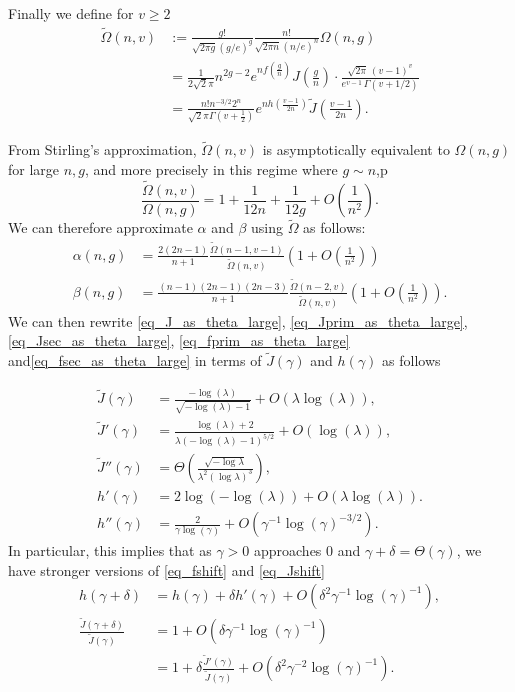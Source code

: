 \documentclass[a4paper,12pt]{article}
\theoremstyle{definition}
\newcommand{\bigO}[1]{O\left({#1}\right)}
\newcommand{\bigTheta}[1]{\Theta\left({#1}\right)}
\begin{document}
Finally we define for $v\geq 2$
\begin{align*}\tilde{\Omega}(n,v)&:=\frac{g!}{\sqrt{2\pi g}(g/e)^{g}}\frac{n!}{\sqrt{2\pi n}(n/e)^{n}}\Omega(n,g)\\
&=\frac{1}{2\sqrt{2}\pi}n^{2g-2}e^{nf(\frac{g}{n})}{J}\left(\frac{g}{n}\right)\cdot\frac{\sqrt{2\pi} \, (v-1)^{v}}{e^{v-1} \, \Gamma(v+1/2)}\\
&=\frac{n!n^{-3/2}2^{n}}{\sqrt{2}\pi\Gamma(v+\frac{1}{2})}e^{nh(\frac{v-1}{2n})}\tilde{J}\left(\frac{v-1}{2n}\right).\end{align*}

From Stirling's approximation, $\tilde{\Omega}(n,v)$ is asymptotically equivalent to $\Omega(n,g)$ for large $n,g$, and more precisely in this regime where $g\sim n$,p
\[\frac{\tilde{\Omega}(n,v)}{\Omega(n,g)}=1+\frac{1}{12n}+\frac{1}{12g}+\bigO{\frac{1}{n^{2}}}.\]
We can therefore approximate $\alpha$ and $\beta$ using $\tilde{\Omega}$ as follows: 
\begin{align}\label{eq:alphainomegatilde}\alpha(n,g)&=\frac{2(2n-1)}{n+1}\frac{\tilde{\Omega}(n-1,v-1)}{\tilde{\Omega}(n,v)}\left(1+O\left(\frac{1}{n^{2}}\right)\right)\\
\label{eq:betainomegatilde}\beta(n,g)&=\frac{(n-1)(2n-1)(2n-3)}{n+1}\frac{\tilde{\Omega}(n-2,v)}{\tilde{\Omega}(n,v)}\left(1+O\left(\frac{1}{n^{2}}\right)\right).\end{align}
We can then rewrite \eqref{eq_J_as_theta_large}, \eqref{eq_Jprim_as_theta_large}, \eqref{eq_Jsec_as_theta_large}, \eqref{eq_fprim_as_theta_large} and\eqref{eq_fsec_as_theta_large}  in terms of $\tilde{J}(\gamma)$ and $h(\gamma)$ as follows

\begin{align}
\tilde{J}(\gamma)
    &= \frac{-\log(\lambda)}{\sqrt{-\log(\lambda)-1}}+\bigO{\lambda\log(\lambda)},
\label{eq_Jtildeser}\\
\tilde{J}'(\gamma)
    &= \frac{\log(\lambda)+2}{\lambda(-\log(\lambda)-1)^{5/2}}+\bigO{\log(\lambda)},
\label{eq_Jprimtildeser}\\
\tilde{J}''(\gamma)
    &= \bigTheta{\frac{\sqrt{-\log \lambda}}{\lambda^2(\log\lambda)^3}},
\label{eq_Jsectildeser}\\
h'(\gamma)&=2\log(-\log(\lambda))+O(\lambda\log(\lambda)).\label{eq_hprime_series}\\
h''(\gamma)&=\frac{2}{\gamma\log(\gamma)}+O(\gamma^{-1}\log(\gamma)^{-3/2}).\label{eq_hsecond_series}
\end{align}
In particular, this implies that as $\gamma>0$ approaches $0$ and $\gamma+\delta=\Theta(\gamma)$, we have stronger versions of \eqref{eq_fshift} and \eqref{eq_Jshift}
\begin{align}h(\gamma+\delta)&=h(\gamma)+\delta h'(\gamma)+O(\delta^{2}\gamma^{-1}\log(\gamma)^{-1}),\label{eq_hshift}\\
\frac{\tilde{J}(\gamma+\delta)}{\tilde{J}(\gamma)}
    &= 1+O\left(\delta\gamma^{-1}\log(\gamma)^{-1}\right)\label{eq_Jtildeshift1}\\
    &= 1+\delta\frac{\tilde{J}'(\gamma)}{\tilde{J}(\gamma)}+O\left(\delta^{2}\gamma^{-2}\log(\gamma)^{-1}\right).\label{eq_Jtildeshift2} \end{align}
\end{document}
